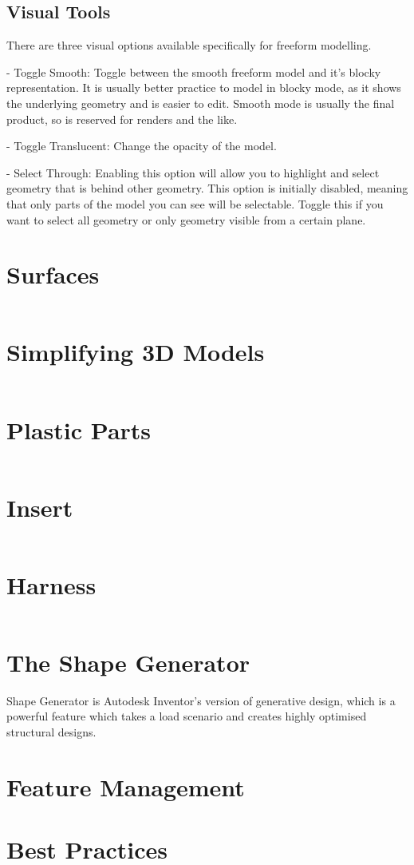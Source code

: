 \subsection{Visual Tools}

There are three visual options available specifically for freeform modelling.

- Toggle Smooth: Toggle between the smooth freeform model and it's blocky representation. It is usually better practice to model in blocky mode, as it shows the underlying geometry and is easier to edit. Smooth mode is usually the final product, so is reserved for renders and the like.

- Toggle Translucent: Change the opacity of the model. 

- Select Through: Enabling this option will allow you to highlight and select geometry that is behind other geometry. This option is initially disabled, meaning that only parts of the model you can see will be selectable. Toggle this if you want to select all geometry or only geometry visible from a certain plane.



\section{Surfaces}
\label{section: 3D Model Surface}

$ $

\section{Simplifying 3D Models}

$ $

\section{Plastic Parts}

$ $

\section{Insert}

$ $

\section{Harness}

$ $

\section{The Shape Generator}
Shape Generator is Autodesk Inventor's version of generative design, which is a powerful feature which takes a load scenario and creates highly optimised structural designs.

\section{Feature Management}

\section{Best Practices}